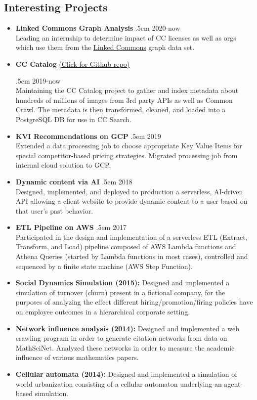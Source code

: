 \documentclass[a4paper]{article}
\makeatletter
\newcommand \brentfill {
  \tiny
  \leavevmode \cleaders 
  \hb@xt@ .5em{\hss \textperiodcentered \hss }\hfill \kern \z@
  \normalsize
}
\newcommand{\bbull}{\ding{118}}
\makeatother
\begin{document}
\subsection*{Interesting Projects \hrulefill}
\begin{itemize}
  \item[\bbull] \textbf{Linked Commons Graph Analysis} \brentfill{} 2020-now\\
    Leading an internship to determine impact of CC licenses as well as orgs
    which use them from the
    \href{http://dataviz.creativecommons.engineering/}{Linked Commons} graph
    data set.
  \item[\bbull] \textbf{CC Catalog}
    \href{https://github.com/creativecommons/cccatalog}{(Click for Github repo)}
    \brentfill{} 2019-now\\
    Maintaining the CC Catalog project to gather and index metadata about
    hundreds of millions of images from 3rd party APIs as well as Common Crawl.
    The metadata is then transformed, cleaned, and loaded into a PostgreSQL DB
    for use in CC Search.
  \item[\bbull] \textbf{KVI Recommendations on GCP} \brentfill{} 2019\\
    Extended a data processing job to choose appropriate Key Value Items for
    special competitor-based pricing strategies.  Migrated processing job from
    internal cloud solution to GCP.
  \item[\bbull] \textbf{Dynamic content via AI} \brentfill{} 2018\\
    Designed, implemented, and deployed to production a serverless, AI-driven API
    allowing a client website to provide dynamic content to a user based on
    that user's past behavior.
  \item[\bbull] \textbf{ETL Pipeline on AWS} \brentfill{} 2017\\
    Participated in the design and implementation of a serverless ETL
    (Extract, Transform, and Load) pipeline composed of AWS Lambda
    functions and Athena Queries (started by Lambda functions in most
    cases), controlled and sequenced by a finite state machine (AWS Step
    Function).
  \item[\bbull] \textbf{Social Dynamics Simulation (2015):}
    Designed and implemented a simulation of turnover (churn) present in
    a fictional company, for the purposes of analyzing the effect
    different hiring/promotion/firing policies have on employee outcomes
    in a hierarchical corporate setting.
  \item[\bbull] \textbf{Network influence analysis (2014):}
    Designed and implemented a web crawling program in order to generate
    citation networks from data on MathSciNet. Analyzed these networks in order
    to measure the academic influence of various mathematics papers.
  \item[\bbull] \textbf{Cellular automata (2014):}
    Designed and implemented a simulation of world urbanization consisting of a
    cellular automaton underlying an agent-based simulation.
\end{itemize}
\end{document}

